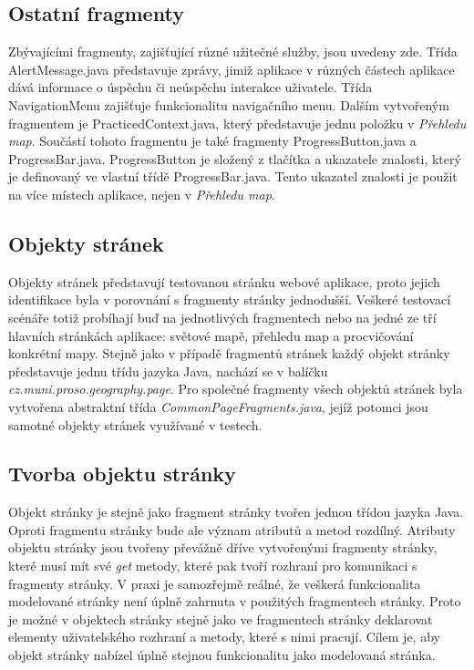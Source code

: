 \documentclass[
    color,   %
	table,   %
    twoside, %
    nolot, nolof
]{fithesis3}
\begin{document}
\subsection*{Ostatní fragmenty}
Zbývajícími fragmenty, zajišťující různé užitečné služby, jsou uvedeny zde. Třída AlertMessage.java představuje zprávy, jimiž aplikace v různých částech aplikace dává informace o úspěchu či neúspěchu interakce uživatele. Třída NavigationMenu zajišťuje funkcionalitu navigačního menu. Dalším vytvořeným fragmentem je PracticedContext.java, který představuje jednu položku v \emph{Přehledu map}. Součástí tohoto fragmentu je také fragmenty ProgressButton.java a ProgressBar.java. ProgressButton je složený z tlačítka a ukazatele znalosti, který je definovaný ve vlastní třídě ProgressBar.java. Tento ukazatel znalosti je použit na více místech aplikace, nejen v \emph{Přehledu map}.

\subsection{Objekty stránek}
Objekty stránek představují testovanou stránku webové aplikace, proto jejich identifikace byla v porovnání s fragmenty stránky jednodušší. Veškeré testovací scénáře totiž probíhají buď na jednotlivých fragmentech nebo na jedné ze tří hlavních stránkách aplikace: světové mapě, přehledu map a procvičování konkrétní mapy. Stejně jako v případě fragmentů stránek každý objekt stránky představuje jednu třídu jazyka Java, nachází se v balíčku \emph{cz.muni.proso.geography.page}. Pro společné fragmenty všech objektů stránek byla vytvořena abstraktní třída \emph{CommonPageFragments.java}, jejíž potomci jsou samotné objekty stránek využívané v testech.

\subsection*{Tvorba objektu stránky}
Objekt stránky je stejně jako fragment stránky tvořen jednou třídou jazyka Java. Oproti fragmentu stránky bude ale význam atributů a metod rozdílný. Atributy objektu stránky jsou tvořeny převážně dříve vytvořenými fragmenty stránky, které musí mít své \emph{get} metody, které pak tvoří rozhraní pro komunikaci s fragmenty stránky. V praxi je samozřejmě reálné, že veškerá funkcionalita modelované stránky není úplně zahrnuta v použitých fragmentech stránky. Proto je možné v objektech stránky stejně jako ve fragmentech stránky deklarovat elementy uživatelského rozhraní a metody, které s nimi pracují. Cílem je, aby objekt stránky nabízel úplně stejnou funkcionalitu jako modelovaná stránka.
\end{document}

